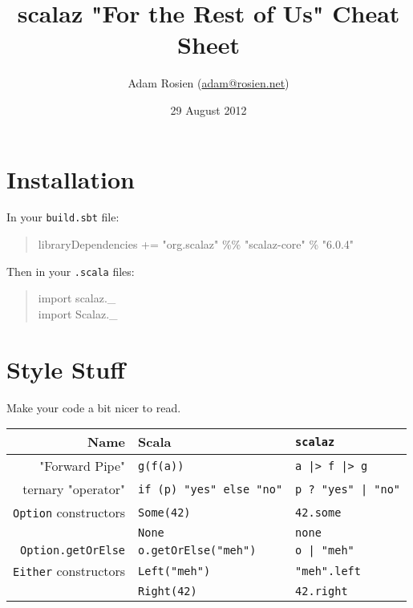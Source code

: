 \documentclass{tufte-handout}
\title{scalaz "For the Rest of Us" Cheat Sheet}
\author[Adam Rosien]{Adam Rosien (\href{mailto:adam@rosien.net}{adam@rosien.net})}
\date{29 August 2012}  %
\begin{document}
\maketitle%


\section{Installation}\label{sec:installation}

In your \texttt{build.sbt} file:

\begin{fullwidth}
\begin{quote}
  \ttfamily
   libraryDependencies += "org.scalaz" \%\% "scalaz-core" \% "6.0.4"
\end{quote}
\end{fullwidth}

\noindent Then in your \texttt{.scala} files: 

\begin{quote}
  \ttfamily import scalaz.\_\\
  import Scalaz.\_
\end{quote}

\section{Style Stuff}\label{sec:style}

Make your code a bit nicer to read.

\begin{table}[ht]
  \centering
  \selectfont
  \begin{tabular}{rll}
    \toprule
    Name & Scala & \texttt{scalaz} \\
    \midrule
    "Forward Pipe"& \texttt{g(f(a))} & \texttt{a |> f |> g}  \\
    ternary "operator" & \texttt{if (p) "yes" else "no"} & \texttt{p ? "yes" | "no"} \\
    \texttt{Option} constructors & \texttt{Some(42)} & \texttt{42.some} \\
                                   & \texttt{None} & \texttt{none} \\
    \texttt{Option.getOrElse} & \texttt{o.getOrElse("meh")} & \texttt{o | "meh"} \\
    \texttt{Either} constructors & \texttt{Left("meh")} & \texttt{"meh".left} \\
                                  & \texttt{Right(42)} & \texttt{42.right} \\
    \bottomrule
  \end{tabular}
  \label{tab:normaltab}
\end{table}
\end{document}
